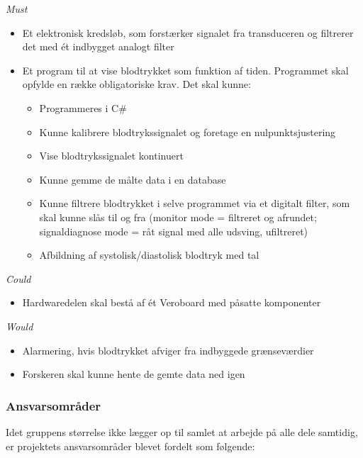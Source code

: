 \textit{Must}
\begin{itemize}
\item Et elektronisk kredsløb, som forstærker signalet fra transduceren og filtrerer det med ét indbygget analogt filter
\item Et program til at vise blodtrykket som funktion af tiden. Programmet skal opfylde en række obligatoriske krav. Det skal kunne:
\begin{itemize}
\item Programmeres i C\#
\item Kunne kalibrere blodtrykssignalet og foretage en nulpunktsjustering
\item Vise blodtrykssignalet kontinuert
\item Kunne gemme de målte data i en database
\item Kunne filtrere blodtrykket i selve programmet via et digitalt filter, som skal kunne slås til og fra (monitor mode = filtreret og afrundet; signaldiagnose mode = råt signal med alle udsving, ufiltreret)
\item Afbildning af systolisk/diastolisk blodtryk med tal
\end{itemize}
\end{itemize}
\textit{Could}
\begin{itemize}
\item Hardwaredelen skal bestå af ét Veroboard med påsatte komponenter

\end{itemize} 
\textit{Would}
\begin{itemize}
\item Alarmering, hvis blodtrykket afviger fra indbyggede grænseværdier
\item Forskeren skal kunne hente de gemte data ned igen
\end{itemize}

\subsubsection{Ansvarsområder}

Idet gruppens størrelse ikke lægger op til samlet at arbejde på alle dele samtidig, er projektets ansvarsområder blevet fordelt som følgende:

